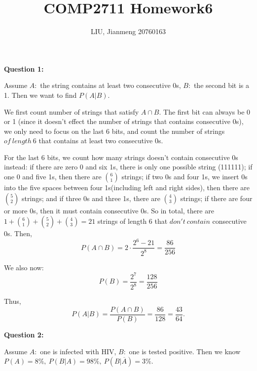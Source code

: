 \documentclass[a4paper,11pt]{article}
\title{\textbf{COMP2711} Homework6}
\author{LIU, Jianmeng 20760163}
\date{}
\begin{document}
    \maketitle

    \begin{spacing}{1.4}

    \setlength{\parindent}{0em}

    \textbf{Question 1:}

    \hspace{2em}
    Assume $A:$ the string contains at least two consecutive 0s, 
    $B:$ the second bit is a 1. Then we want to find $P(A|B).$

    \hspace{2em}
    We first count number of strings that satisfy $A\cap B$.
    The first bit can always be 0 or 1 (since it doesn't effect
    the number of strings that contains consecutive 0s), we only
    need to focus on the last 6 bits, and count the number of strings
    $of\ length\ 6$ that contains at least two consecutive 0s.

    \hspace{2em}
    For the last 6 bits, we count how many strings doesn't contain
    consecutive 0s instead:
    if there are zero 0 and six 1s, 
    there is only one possible string (111111); if one 0 and 
    five 1s, then there are ${6\choose 1}$ strings; 
    if two 0s and four 1s, we insert 0s into the five spaces between
    four 1s(including left and right sides), then there are 
    ${5\choose 2}$ strings; and if three 0s and three 1s,
    there are ${4\choose 3}$ strings; if there are four or more 0s,
    then it must contain consecutive 0s. So in total, there are
    $1+{6\choose 1}+{5\choose 2}+{4\choose 3}=21$ strings of length 6
    that $don't\ contain$ consecutive 0s. Then,
    $$P(A\cap B)=2\cdot \frac{2^6-21}{2^8}=\frac{86}{256}$$
    
    We also now:
    $$P(B)=\frac{2^7}{2^8}=\frac{128}{256}$$

    Thus,
    $$P(A|B)=\frac{P(A\cap B)}{P(B)}=\frac{86}{128}=\frac{43}{64}.$$


    \textbf{Question 2:}

    \hspace{2em}
    Assume $A:$ one is infected with HIV, $B:$ one is tested positive.
    Then we know $P(A)=8\%,\ P(B|A)=98\%,\ P(B|\overline{A})=3\%$.


\end{spacing}
\end{document}
